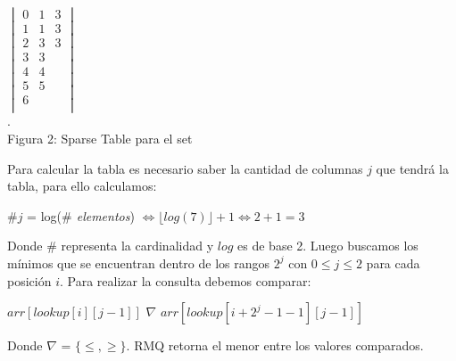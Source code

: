 \documentclass[11pt]{article}
\begin{document}
\begin{center}$\begin{vmatrix}
	0 & 1 & 3   \\
	1 & 1 & 3   \\
	2 & 3 & 3   \\
	3 & 3 &     \\
	4 & 4 &     \\
	5 & 5 &     \\
	6 &   &	    \\
\end{vmatrix}$
\\\scriptsize{\color{white}.\color{black}\\Figura 2: Sparse Table para el set}
\end{center}
Para calcular la tabla es necesario saber la cantidad de columnas $j$ que tendrá la tabla, para ello calculamos:
\begin{center}$\#j$ = log(\emph{$\#$ elementos})  $\iff \lfloor log(7) \rfloor+1 \iff 2 +1 = 3$
\end{center}
Donde $\#$ representa la cardinalidad y $log$ es de base 2. Luego buscamos los mínimos que se encuentran dentro de los rangos $2^j$ con $0\le j \le 2$ para cada posición $i$. Para realizar la consulta debemos comparar:
\begin{center}$arr[lookup[i][j-1]]$ $\nabla$ $arr[lookup[i+2^j-1-1][j-1]]$\end{center}
Donde $\nabla$ = $\{\le,\geq\}$. RMQ retorna el menor entre los valores comparados. 
\end{document}
